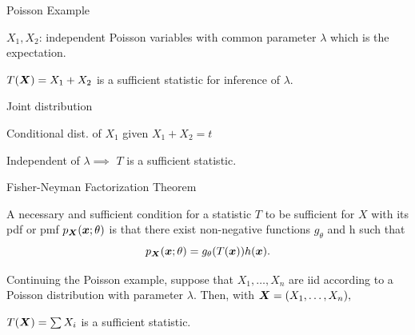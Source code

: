\documentclass[handout,fleqn,aspectratio=169]{beamer}
\begin{document}
\begin{frame}{Poisson Example} 

\plitemsep 0.1in

\bci 

\item $X_1, X_2$: independent Poisson variables with common parameter $\lambda$ which is the expectation. 
\item {} $T(\bm{X}) = X_1 + X_2$ is a sufficient statistic for inference of $\lambda.$

\item Joint distribution

\item Conditional dist. of $X_1$ given $X_1+X_2=t$ 

\item  Independent of $\lambda \implies$ $T$ is a sufficient statistic.

\eci

\end{frame}

\begin{frame}{Fisher-Neyman Factorization Theorem} 

{
A necessary and sufficient condition for a statistic $T$ to be sufficient 
for $X$ with its pdf or pmf $p_{\bm{X}}(\bm{x};\theta)$ is that there exist non-negative functions $g_{\theta}$ and h such that 
$$
p_{\bm{X}}(\bm{x};\theta) = g_\theta(T(\bm{x})) h(\bm{x}).
$$
\vspace{-0.3cm}
}
\plitemsep 0.1in
\bci 
\item \exam Continuing the Poisson example, suppose that $X_1, \ldots, X_n$ are iid according to a Poisson distribution with parameter $\lambda$. Then, with $\bm{X} = (X_1, \ldots, X_n),$
\item $T(\bm{X}) = \sum X_i$ is a sufficient statistic.  
\eci


\end{frame}
\end{document}
